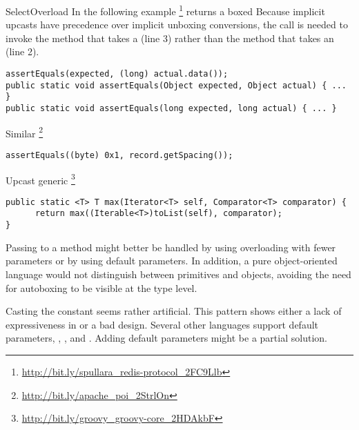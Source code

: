 \begin{pattern}{SelectOverload}
In the following example%
\footnote{\url{http://bit.ly/spullara_redis-protocol_2FC9Llb}}
 returns a boxed 
Because implicit upcasts have precedence over implicit unboxing conversions,
the call is needed to invoke the method that takes a 
  (line 3)
  rather than the method that takes an  (line 2).
%
\begin{verbatim}
assertEquals(expected, (long) actual.data());
public static void assertEquals(Object expected, Object actual) { ... }
public static void assertEquals(long expected, long actual) { ... }
\end{verbatim}


Similar%
\footnote{\url{http://bit.ly/apache_poi_2StrlOn}}

\begin{verbatim}
assertEquals((byte) 0x1, record.getSpacing());
\end{verbatim}

Upcast generic%
\footnote{\url{http://bit.ly/groovy_groovy-core_2HDAkbF}}

\begin{verbatim}
public static <T> T max(Iterator<T> self, Comparator<T> comparator) {
      return max((Iterable<T>)toList(self), comparator);
}
\end{verbatim}

\discussion{}
  Passing  to a method might better be handled by using overloading
  with fewer parameters or by using default parameters.
  In addition, a pure object-oriented language would not distinguish between primitives and 
  objects, avoiding the need for autoboxing to be visible at the type level.

Casting the  constant seems rather artificial.
This pattern shows either a lack of expressiveness in \java{} or
a bad \api{} design.
Several other languages support default parameters, \eg{},
\scala{}, \csharp{} and \cpp{}.
Adding default parameters might be a partial solution.
\end{pattern}